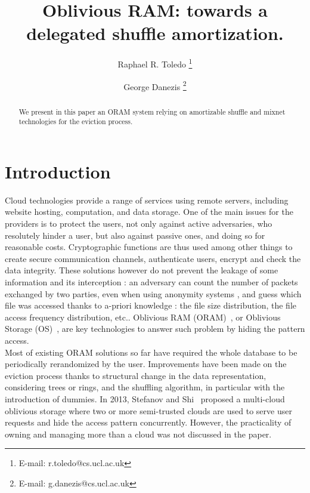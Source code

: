 \documentclass[a4paper]{article}
\begin{document}
\author{Raphael R. Toledo \thanks{E-mail: r.toledo@cs.ucl.ac.uk} }
\author{George Danezis \thanks{E-mail: g.danezis@cs.ucl.ac.uk} }


\title{Oblivious RAM: towards a delegated shuffle amortization.}

\maketitle

\begin{abstract}
{
We present in this paper an ORAM system relying on amortizable shuffle and mixnet technologies for the eviction process.
}
\end{abstract}

\section{Introduction}
Cloud technologies provide a range of services using remote servers, including website hosting, computation, and data storage. One of the main issues for the providers is to protect the users, not only against active adversaries, who resolutely hinder a user, but also against passive ones, and doing so for reasonable costs. 
Cryptographic functions are thus used among other things to create secure communication channels, authenticate users, encrypt and check the data integrity. These solutions however do not prevent the leakage of some information and its interception : an adversary can count the number of packets exchanged by two parties, even when using anonymity systems \cite{murdoch2005}, and guess which file was accessed thanks to a-priori knowledge : the file size distribution, the file access frequency distribution, etc..
Oblivious RAM (ORAM)~\cite{goldreich87}, or Oblivious Storage (OS)~\cite{boneh2011}, are key technologies to answer such problem by hiding the pattern access.\\

Most of existing ORAM solutions so far have required the whole database to be periodically rerandomized by the user. Improvements have been made on the eviction process thanks to structural change in the data representation, considering trees or rings, and the shuffling algorithm, in particular with the introduction of dummies.
In 2013, Stefanov and Shi~\cite{stefanov2013} proposed a multi-cloud oblivious storage where two or more semi-trusted clouds are used to serve user requests and hide the access pattern concurrently. However, the practicality of owning and managing more than a cloud was not discussed in the paper. \\
\end{document}
